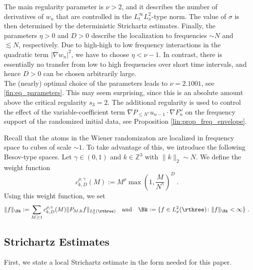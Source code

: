 \documentclass[11pt]{article}
\begin{document}
The main regularity parameter is \( \nu > 2 \), and it describes the number of derivatives of \( w_n \) that are controlled in the \( L_t^\infty L_x^2 \)-type norm. The value of \( \sigma \) is then determined by the deterministic Strichartz estimates. Finally, the parameters \( \eta> 0 \) and \( D >0 \) describe the localization to frequencies \( \sim N \) and \( \lesssim N \), respectively. Due to high-high to low frequency interactions in the quadratic term \( |\nabla w_n|^2 \), we have to choose \( \eta < \nu - 1 \). In contrast, there is essentially no transfer from low to high frequencies over short time intervals, and hence \( D >0 \) can be chosen arbitrarily large. \\
The (nearly) optimal choice of the parameters leads to \( \nu = 2.1001 \), see \eqref{fin:eq_parameters}. This may seem surprising, since this is an absolute amount above the critical regularity \( s_3 = 2 \). The additional regularity is used to control the effect of the variable-coefficient term \( \nabla P_{\leq N^\gamma} u_{n-1} \cdot \nabla F_n^\omega \) on the frequency support of the randomized initial data, see Proposition  \ref{lin:prop_freq_envelope}.


Recall that the atoms in the Wiener randomizaton are localized in frequency space to cubes of scale \( \sim 1 \). To take advantage of this, we introduce the following Besov-type spaces.
Let \( \gamma \in (0,1) \) and \( k \in \mathbb{Z}^3 \) with \( \| k \|_2 \sim N \). We define the weight function
\begin{equation}\label{prelim:eq_ck}
c^{\rho,\gamma}_{k,D}(M) := M^\rho \max \left( 1, \frac{M}{N^\gamma} \right)^{D}~. 
\end{equation}
Using this weight function, we set
\begin{equation*}
\| f \|_{\Bk} := \sum_{M\geq 1} c^{\rho,\gamma}_{k,D}(M) \| P_{M;k} f \|_{L_x^2(\rthree)} \quad \text{and} \quad \Bk := \{ f \in L_x^2(\rthree)\colon \| f \|_{\Bk}  < \infty \}~. 
\end{equation*}

\subsection{Strichartz Estimates}\label{sec:strichartz}

First, we state a local Strichartz estimate in the form needed for this paper. 
\end{document}
